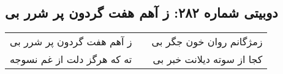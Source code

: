 \begin{center}
\section*{دوبیتی شماره ۲۸۲: ز آهم هفت گردون پر شرر بی}
\label{sec:282}
\begin{longtable}{l p{0.5cm} r}
ز آهم هفت گردون پر شرر بی
&&
زمژگانم روان خون جگر بی
\\
ته که هرگز دلت از غم نسوجه
&&
کجا از سوته دیلانت خبر بی
\\
\end{longtable}
\end{center}
